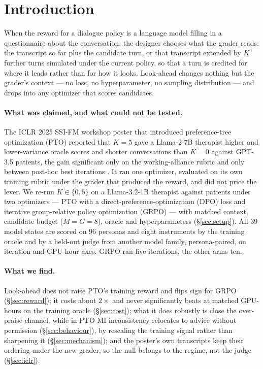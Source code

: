 \section{Introduction}
\label{sec:intro}

When the reward for a dialogue policy is a language model filling in a questionnaire about the
conversation, the designer chooses what the grader reads: the transcript so far plus the
candidate turn, or that transcript extended by $K$ further turns simulated under the current
policy, so that a turn is credited for where it leads rather than for how it looks. Look-ahead
changes nothing but the grader's context --- no loss, no hyperparameter, no sampling
distribution --- and drops into any optimizer that scores candidates.

\paragraph{What was claimed, and what could not be tested.} The ICLR 2025 SSI-FM workshop
poster that introduced preference-tree optimization (PTO) reported that $K{=}5$ gave a Llama-2-7B therapist
higher and lower-variance oracle scores and shorter conversations than $K{=}0$ against GPT-3.5
patients, the gain significant only on the working-alliance rubric and only between post-hoc
best iterations \citep{baruch2025pto}. It ran one optimizer, evaluated on its own training
rubric under the grader that produced the reward, and did not price the lever. We re-run $K \in \{0, 5\}$ on a Llama-3.2-1B therapist against
\primaryjudge{} patients under two optimizers --- PTO with a direct-preference-optimization
(DPO) loss and iterative group-relative policy optimization (GRPO) --- with matched context, candidate budget ($M{=}G{=}8$), oracle and hyperparameters
(\S\ref{sec:setup}). All 39 model states are scored on 96 personas and eight instruments by the
training oracle and by a held-out judge from another model family, persona-paired, on iteration
and GPU-hour axes. GRPO \Kf{} ran five iterations, the other arms ten.

\paragraph{What we find.} Look-ahead does not raise PTO's training reward and flips sign for
GRPO (\S\ref{sec:reward}); it costs about $2\times$ and never significantly beats \Kz{} at
matched GPU-hours on the training oracle (\S\ref{sec:cost}); what it does robustly is close the
over-praise channel, while in PTO MI-inconsistency relocates to advice without permission
(\S\ref{sec:behaviour}), by rescaling the training signal rather than sharpening it
(\S\ref{sec:mechanism}); and the poster's own transcripts keep their ordering under the new
grader, so the null belongs to the regime, not the judge (\S\ref{sec:iclr}).

